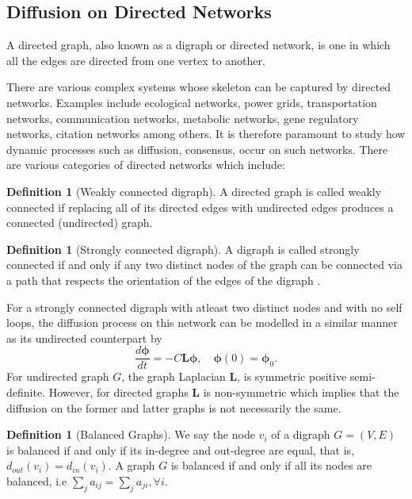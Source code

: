 \documentclass[10pt,a4paper]{article}
\theoremstyle{plain}
\theoremstyle{definition}
\newtheorem{defn}[subsection]{Definition}
\begin{document}
     \newpage
     
        \subsection{Diffusion on Directed Networks}
        A directed graph, also known as a digraph or directed network, is one in which all the edges are directed from one vertex to another. 
        
        There are various complex systems whose skeleton can be captured by directed networks. Examples include ecological  networks, power grids, transportation networks, communication networks, metabolic networks, gene regulatory networks, citation networks among others. It is therefore paramount to study how dynamic processes such as diffusion, consensus, occur on such networks. There are various categories of directed networks which include:
        \begin{defn}[Weakly connected digraph]
        	A directed graph is called weakly connected if replacing all of its directed edges with undirected edges produces a connected (undirected) graph.
          \end{defn}   
        \begin{defn}[Strongly connected digraph]
        	A digraph is called strongly connected if and only if any two distinct nodes of the graph can be connected via a path that respects the orientation of the edges of the digraph \citep{saber2003agreement}.
        \end{defn}        
        For a strongly connected digraph with atleast two distinct nodes and with no self loops, the diffusion process on this network can be modelled in a similar manner as its undirected counterpart by 
        \begin{equation}
        \frac{d\boldsymbol{\phi}}{dt} = -C\mathbf{L}\boldsymbol{\phi}, \quad \boldsymbol{\phi}(0) = \boldsymbol{\phi}_0.
        \end{equation}
        For undirected graph $G$, the graph Laplacian $\mathbf{L}$, is symmetric positive semi-definite. However, for directed graphs $\mathbf{L}$ is non-symmetric which implies that the diffusion on the former and latter graphs is not necessarily the same.
        
         \begin{defn}[Balanced Graphs]
        	We say the node $v_i$ of a digraph $G=(V,E)$ is balanced if and only if its in-degree and out-degree are equal, that is, $d_{out}(v_i) =d_{in}(v_i)$. A graph $G$ is balanced if and only if all its nodes are balanced, i.e $\sum_j a_{ij} = \sum_j a_{ji}, \forall i$. 
        \end{defn}
        
\end{document}

